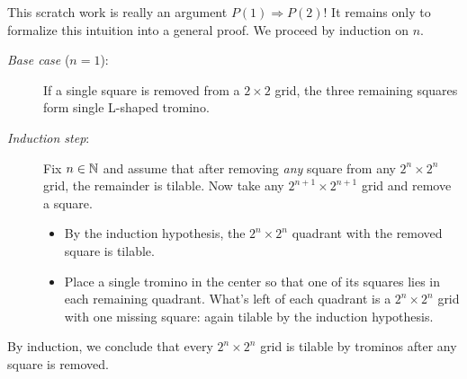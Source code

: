 \begin{example}{}{}
	This scratch work is really an argument $P(1)\Longrightarrow P(2)$! It remains only to formalize this intuition into a general proof. We proceed by induction on $n$.
	\begin{description}
		\item[\normalfont\emph{Base case} ($n=1$):] If a single square is removed from a $2\times 2$ grid, the three remaining squares form single L-shaped tromino.
		\item[\normalfont\emph{Induction step}:] Fix $n\in\mathbb{N}$ and assume that after removing \emph{any} square from any $2^n\times 2^n$ grid, the remainder is tilable. Now take any $2^{n+1}\times 2^{n+1}$ grid and remove a square.
	\begin{itemize}
	  \item By the induction hypothesis, the $2^n\times 2^n$ quadrant with the removed square is tilable.
	  \item Place a single tromino in the center so that one of its squares lies in each remaining quadrant. What's left of each quadrant is a $2^n\times 2^n$ grid with one missing square: again tilable by the induction hypothesis.
	\end{itemize}  
	\end{description}
	By induction, we conclude that every $2^n\times 2^n$ grid is tilable by trominos after any square is removed.
\end{example}


\goodbreak

